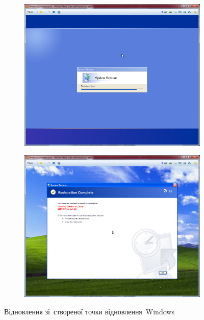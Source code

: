 \documentclass[
	a4paper,
	oneside,
	DIV = 12,
	fontsize = 13pt,
	headings = normal,
]{scrartcl}
\begin{document}
\begin{figure}[!htbp]
\begin{subfigure}{0.5\columnwidth}
					\caption{}
					\label{subfig:06-01-windows-sysrestore-selection-finish}
				\end{subfigure}
				\begin{subfigure}{0.5\columnwidth}
					\centering
					\includegraphics[height = 8\baselineskip]{./assets/y03s01-pcdiag-lab-04-p12.png}
					\caption{}
					\label{subfig:06-03-windows-sysrestore-restoration-start}
				\end{subfigure}%
				\begin{subfigure}{0.5\columnwidth}
					\centering
					\includegraphics[height = 8\baselineskip]{./assets/y03s01-pcdiag-lab-04-p13.png}
					\caption{}
					\label{subfig:06-04-windows-sysrestore-restoration-finish}
				\end{subfigure}%
				\caption{Відновлення зі~створеної точки відновлення~\textenglish{Windows}}
				\label{fig:06-windows-sysrestore-selection}
			\end{figure}
\end{document}
